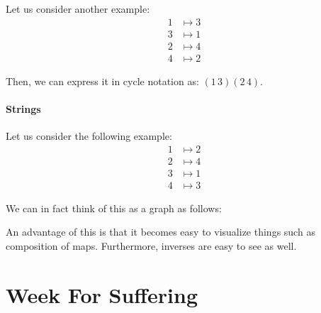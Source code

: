 \documentclass[openany]{book}
\begin{document}
Let us consider another example:
\begin{align*}
	1 &\mapsto 3 \\
	3 &\mapsto 1 \\
	2 &\mapsto 4 \\
	4 &\mapsto 2
\end{align*}

Then, we can express it in cycle notation as: $(1 \, 3)(2 \, 4)$.

\subsubsection{Strings}
Let us consider the following example:
\begin{align*}
	1 &\mapsto 2 \\
	2 &\mapsto 4 \\
	3 &\mapsto 1 \\
	4 &\mapsto 3
\end{align*}

We can in fact think of this as a graph as follows:
\begin{center}
\end{center}

An advantage of this is that it becomes easy to visualize things such as composition of maps. Furthermore, inverses are easy to see as well.

\chapter{Week For Suffering}
\end{document}
